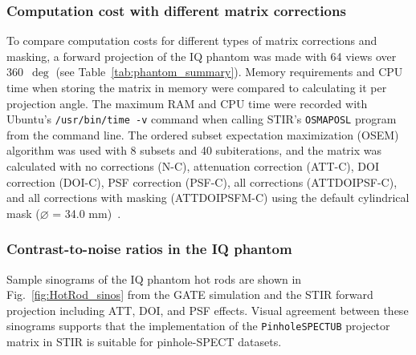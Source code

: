 \documentclass[utf8]{FrontiersinVancouver}
\begin{document}
\subsubsection{Computation cost with different matrix corrections}

To compare computation costs for different types of matrix corrections and masking, a forward projection of the IQ phantom was made with 64 views over 360~$\deg$ (see Table~\ref{tab:phantom_summary}). Memory requirements and CPU time when storing the matrix in memory were compared to calculating it per projection angle. The maximum RAM and CPU time were recorded with Ubuntu's \texttt{/usr/bin/time -v} command when calling STIR's \texttt{OSMAPOSL} program from the command line. The ordered subset expectation maximization (OSEM) algorithm was used with 8 subsets and 40 subiterations, and the matrix was calculated with no corrections (N-C), attenuation correction (ATT-C), DOI correction (DOI-C), PSF correction (PSF-C), all corrections (ATTDOIPSF-C), and all corrections with masking (ATTDOIPSFM-C) using the default cylindrical mask ($\diameter$ = 34.0 mm)~\citep{hudson_accelerated_1994}.

\subsubsection{Contrast-to-noise ratios in the IQ phantom}

Sample sinograms of the IQ phantom hot rods are shown in Fig.~\ref{fig:HotRod_sinos} from the GATE simulation and the STIR forward projection including ATT, DOI, and PSF effects. Visual agreement between these sinograms supports that the implementation of the \texttt{PinholeSPECTUB} projector matrix in STIR is suitable for pinhole-SPECT datasets.
\end{document}
